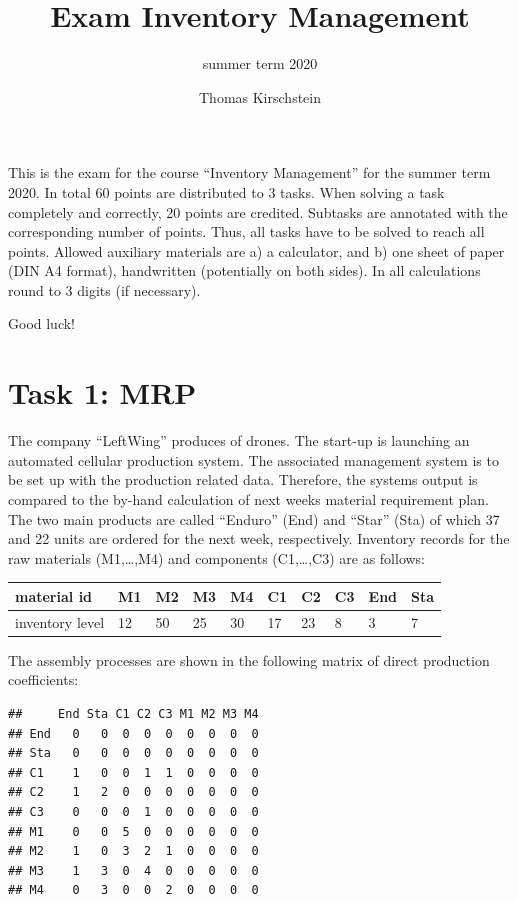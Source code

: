 \documentclass[
]{article}
\title{Exam Inventory Management}
\subtitle{summer term 2020}
\author{Thomas Kirschstein}
\date{}
\begin{document}
\maketitle

This is the exam for the course ``Inventory Management'' for the summer
term 2020. In total 60 points are distributed to 3 tasks. When solving a
task completely and correctly, 20 points are credited. Subtasks are
annotated with the corresponding number of points. Thus, all tasks have
to be solved to reach all points. Allowed auxiliary materials are a) a
calculator, and b) one sheet of paper (DIN A4 format), handwritten
(potentially on both sides). In all calculations round to 3 digits (if
necessary).

Good luck!

\hypertarget{task-1-mrp}{%
\section{Task 1: MRP}\label{task-1-mrp}}

The company ``LeftWing'' produces of drones. The start-up is launching
an automated cellular production system. The associated management
system is to be set up with the production related data. Therefore, the
systems output is compared to the by-hand calculation of next weeks
material requirement plan. The two main products are called ``Enduro''
(End) and ``Star'' (Sta) of which 37 and 22 units are ordered for the
next week, respectively. Inventory records for the raw materials
(M1,\ldots,M4) and components (C1,\ldots,C3) are as follows:

\begin{longtable}[]{@{}llllllllll@{}}
\toprule
material id & M1 & M2 & M3 & M4 & C1 & C2 & C3 & End &
Sta\tabularnewline
\midrule
\endhead
inventory level & 12 & 50 & 25 & 30 & 17 & 23 & 8 & 3 & 7\tabularnewline
\bottomrule
\end{longtable}

The assembly processes are shown in the following matrix of direct
production coefficients:

\begin{verbatim}
##     End Sta C1 C2 C3 M1 M2 M3 M4
## End   0   0  0  0  0  0  0  0  0
## Sta   0   0  0  0  0  0  0  0  0
## C1    1   0  0  1  1  0  0  0  0
## C2    1   2  0  0  0  0  0  0  0
## C3    0   0  0  1  0  0  0  0  0
## M1    0   0  5  0  0  0  0  0  0
## M2    1   0  3  2  1  0  0  0  0
## M3    1   3  0  4  0  0  0  0  0
## M4    0   3  0  0  2  0  0  0  0
\end{verbatim}
\end{document}
